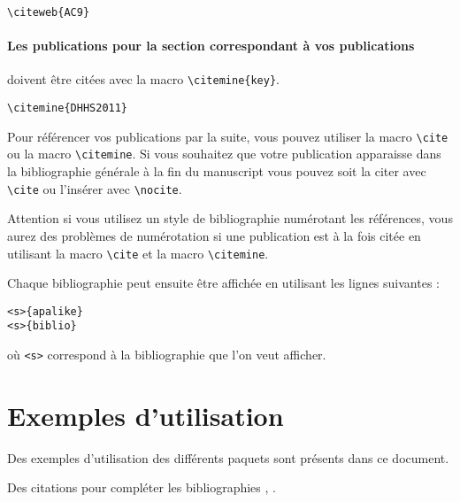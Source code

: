 \begin{framed}
\noindent{} \vspace{-0.5em}
\begin{verbatim}\citeweb{AC9}\end{verbatim}\vspace{-0.75em}
\end{framed}

\paragraph{Les publications pour la section correspondant à vos publications} doivent être citées avec la macro \texttt{\textbackslash citemine\{key\}}.

\begin{framed}
\noindent{} \vspace{-0.5em}
\begin{verbatim}\citemine{DHHS2011}\end{verbatim}\vspace{-0.75em}
\end{framed}

Pour référencer vos publications par la suite, vous pouvez utiliser la macro \texttt{\textbackslash cite} ou la macro \texttt{\textbackslash citemine}.
Si vous souhaitez que votre publication apparaisse dans la bibliographie générale à la fin du manuscript vous pouvez soit la citer avec \texttt{\textbackslash cite} ou l'insérer avec \texttt{\textbackslash nocite}. \nocite{DHHS2011} 

Attention si vous utilisez un style de bibliographie numérotant les références, vous aurez des problèmes de numérotation si une publication est à la fois citée en utilisant la macro \texttt{\textbackslash cite} et la macro \texttt{\textbackslash citemine}.


Chaque bibliographie peut ensuite être affichée en utilisant les lignes suivantes :

\begin{framed}
\begin{verbatim}<s>{apalike}
<s>{biblio}
\end{verbatim}\vspace{-0.5em}
\end{framed}

où \verb|<s>| correspond à la bibliographie que l'on veut afficher.


\section{Exemples d'utilisation}

Des exemples d'utilisation des différents paquets sont présents dans ce document.


Des citations pour compléter les bibliographies , .
 

  
\renewcommand{\bibtitle}{\section*{\refname}}


